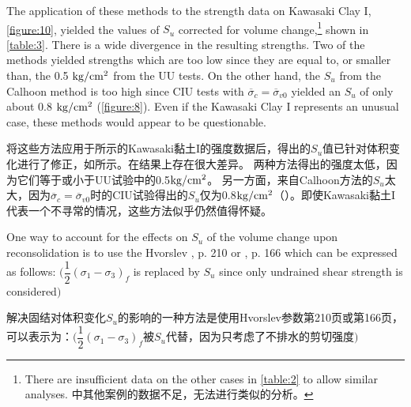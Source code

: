 \begin{paracol}{2}
    The application of these methods to the strength data on Kawasaki Clay I, \autoref{figure:10}, yielded the values of $S_u$ corrected for volume change,\footnote{
        There are insufficient data on the other cases in \autoref{table:2} to allow similar analyses. 中其他案例的数据不足，无法进行类似的分析。
    } shown in \autoref{table:3}. There is a wide divergence in the resulting strengths. Two of the methods yielded strengths which are too low since they are equal to, or smaller than, the 0.5 $\rm{kg/cm^2}$ from the UU tests. On the other hand, the $S_u$ from the Calhoon method is too high since CIU tests with $\overline{\sigma}_c=\overline{\sigma}_{v0}$ yielded an $S_u$ of only about 0.8 $\rm{kg/cm^2}$ (\autoref{figure:8}). Even if the Kawasaki Clay I represents an unusual case, these methods would appear to be questionable.

    \switchcolumn

    将这些方法应用于所示的Kawasaki黏土I的强度数据后，得出的$S_u$值已针对体积变化进行了修正，如所示。在结果上存在很大差异。 两种方法得出的强度太低，因为它们等于或小于UU试验中的0.5$\rm{kg/cm^2}$。 另一方面，来自Calhoon方法的$S_u$太大，因为$\overline{\sigma}_c=\overline{\sigma}_{v0}$时的CIU试验得出的$S_u$仅为0.8$\rm{kg/cm^2}$（）。即使Kawasaki黏土I代表一个不寻常的情况，这些方法似乎仍然值得怀疑。

\end{paracol}




\begin{paracol}{2}

    One way to account for the effects on $S_u$ of the volume change upon reconsolidation is to use the Hvorslev \citet{Hvorslev1960169}, p. 210 or \citet{Bishop1962}, p. 166 which can be expressed as follows: $\big(\dfrac{1}{2}(\sigma_1-\sigma_3)_f$ is replaced by $S_u$ since only undrained shear strength is considered$\big)$

    \switchcolumn

    解决固结对体积变化$S_u$的影响的一种方法是使用Hvorslev参数\citet{Hvorslev1960169}第210页或\citet{Bishop1962}第166页，可以表示为：$\big(\dfrac{1}{2}(\sigma_1-\sigma_3)_f$被$S_u$代替，因为只考虑了不排水的剪切强度$\big)$

\end{paracol}

